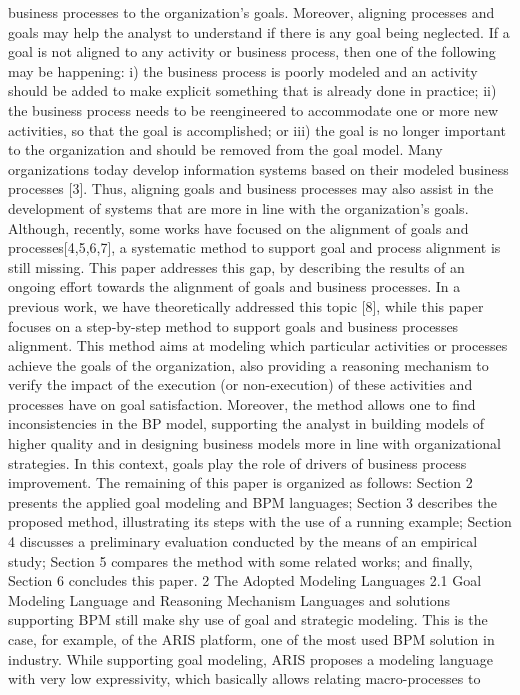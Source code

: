 business processes to the organization's goals. Moreover, aligning processes and goals 
may help the analyst to understand if there is any goal being neglected. If a goal is not
aligned to any activity or business process, then one of the following may be happening:
i) the business process is poorly modeled and an activity should be added to make explicit something that is already done in practice; ii) the business process needs to be
reengineered to accommodate one or more new activities, so that the goal is accomplished; or iii) the goal is no longer important to the organization and should be removed
from the goal model.
Many organizations today develop information systems based on their modeled business processes [3]. Thus, aligning goals and business processes may also assist in the
development of systems that are more in line with the organization's goals.
Although, recently, some works have focused on the alignment of goals and processes[4,5,6,7], a systematic method to support goal and process alignment is still missing. This paper addresses this gap, by describing the results of an ongoing effort towards
the alignment of goals and business processes. In a previous work, we have theoretically addressed this topic [8], while this paper focuses on a step-by-step method to support goals and business processes alignment. This method aims at modeling which particular activities or processes achieve the goals of the organization, also providing a
reasoning mechanism to verify the impact of the execution (or non-execution) of these
activities and processes have on goal satisfaction. Moreover, the method allows one to
find inconsistencies in the BP model, supporting the analyst in building models of
higher quality and in designing business models more in line with organizational strategies. In this context, goals play the role of drivers of business process improvement.
The remaining of this paper is organized as follows: Section 2 presents the applied
goal modeling and BPM languages; Section 3 describes the proposed method, illustrating its steps with the use of a running example; Section 4 discusses a preliminary evaluation conducted by the means of an empirical study; Section 5 compares the method
with some related works; and finally, Section 6 concludes this paper.
2 The Adopted Modeling Languages
2.1 Goal Modeling Language and Reasoning Mechanism
Languages and solutions supporting BPM still make shy use of goal and strategic modeling. This is the case, for example, of the ARIS platform, one of the most used BPM
solution in industry. While supporting goal modeling, ARIS proposes a modeling language with very low expressivity, which basically allows relating macro-processes to
